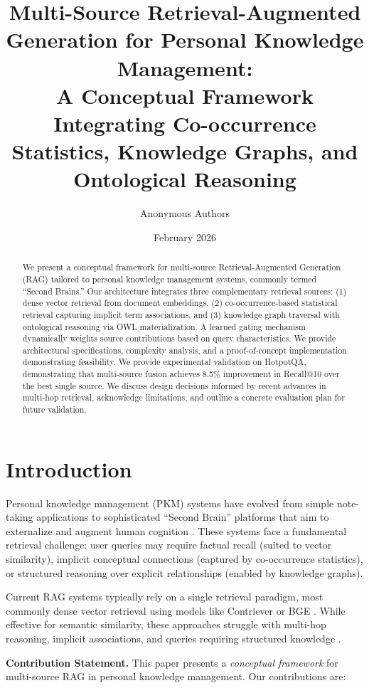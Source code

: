 \documentclass[11pt,a4paper]{article}
\title{Multi-Source Retrieval-Augmented Generation for Personal Knowledge Management: \\
A Conceptual Framework Integrating Co-occurrence Statistics, Knowledge Graphs, and Ontological Reasoning}
\author{Anonymous Authors}
\date{February 2026}
\begin{document}
\maketitle

\begin{abstract}
We present a conceptual framework for multi-source Retrieval-Augmented Generation (RAG) tailored to personal knowledge management systems, commonly termed ``Second Brains.'' Our architecture integrates three complementary retrieval sources: (1) dense vector retrieval from document embeddings, (2) co-occurrence-based statistical retrieval capturing implicit term associations, and (3) knowledge graph traversal with ontological reasoning via OWL materialization. A learned gating mechanism dynamically weights source contributions based on query characteristics. We provide architectural specifications, complexity analysis, and a proof-of-concept implementation demonstrating feasibility. We provide experimental validation on HotpotQA, demonstrating that multi-source fusion achieves 8.5\% improvement in Recall@10 over the best single source. We discuss design decisions informed by recent advances in multi-hop retrieval, acknowledge limitations, and outline a concrete evaluation plan for future validation.
\end{abstract}

\section{Introduction}
\label{sec:introduction}

Personal knowledge management (PKM) systems have evolved from simple note-taking applications to sophisticated ``Second Brain'' platforms that aim to externalize and augment human cognition \citep{forte2022building}. These systems face a fundamental retrieval challenge: user queries may require factual recall (suited to vector similarity), implicit conceptual connections (captured by co-occurrence statistics), or structured reasoning over explicit relationships (enabled by knowledge graphs).

Current RAG systems typically rely on a single retrieval paradigm, most commonly dense vector retrieval using models like Contriever \citep{izacard2022unsupervised} or BGE \citep{xiao2023bge}. While effective for semantic similarity, these approaches struggle with multi-hop reasoning, implicit associations, and queries requiring structured knowledge \citep{xiong2021answering}.

\textbf{Contribution Statement.} This paper presents a \textit{conceptual framework} for multi-source RAG in personal knowledge management. Our contributions are:
\end{document}
